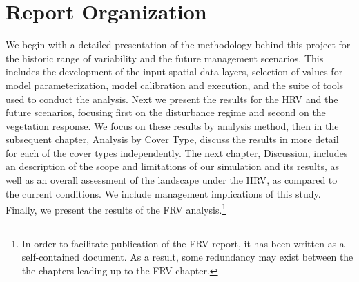 \section{Report Organization}

We begin with a detailed presentation of the methodology behind this project for the historic range of variability and the future management scenarios. This includes the development of the input spatial data layers, selection of values for model parameterization, model calibration and execution, and the suite of tools used to conduct the analysis. Next we present the results for the HRV and the future scenarios, focusing first on the disturbance regime and second on the vegetation response. We focus on these results by analysis method, then in the subsequent chapter, Analysis by Cover Type, discuss the results in more detail for each of the cover types independently. The next chapter, Discussion, includes an description of the scope and limitations of our simulation and its results, as well as an overall assessment of the landscape under the HRV, as compared to the current conditions. We include management implications of this study. Finally, we present the results of the FRV analysis.\footnote{In order to facilitate publication of the FRV report, it has been written as a self-contained document. As a result, some redundancy may exist between the the chapters leading up to the FRV chapter.}
